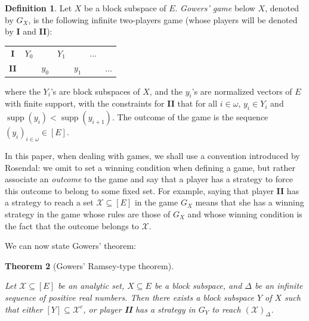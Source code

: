 \documentclass[a4paper,11pt]{article}
\newtheorem{thm}{Theorem}[section]
\theoremstyle{definition}
\newtheorem{defin}[thm]{Definition}
\numberwithin{equation}{section}
\newcommand{\X}{\mathcal{X}}
\newcommand{\I}{\textbf{I}}
\newcommand{\II}{\textbf{II}}
\DeclareMathOperator{\supp}{supp}
\begin{document}
\begin{defin}

Let $X$ be a block subspace of $E$. \emph{Gowers' game} below $X$, denoted by $G_X$, is the following infinite two-players game (whose players will be denoted by \I{} and \II{}):

\smallskip

\begin{tabular}{ccccccc}
\textbf{I} & $Y_0$ & & $Y_1$ & & $\hdots$ & \\
\textbf{II} & & $y_0$ & & $y_1$ & & $\hdots$ 
\end{tabular}

\smallskip

\noindent where the $Y_i$'s are block subspaces of $X$, and the $y_i$'s are normalized vectors of $E$ with finite support, with the constraints for \II{} that for all $i \in \omega$, $y_i \in Y_i$ and $\supp(y_i) < \supp(y_{i + 1})$. The outcome of the game is the sequence $(y_i)_{i \in \omega} \in [E]$.

\end{defin}

In this paper, when dealing with games, we shall use a convention introduced by Rosendal: we omit to set a winning condition when defining a game, but rather associate an \emph{outcome} to the game and say that a player has a strategy to force this outcome to belong to some fixed set. For example, saying that player \II{} has a strategy to reach a set $\X \subseteq [E]$ in the game $G_X$ means that she has a winning strategy in the game whose rules are those of $G_X$ and whose winning condition is the fact that the outcome belongs to $\X$.

\smallskip

We can now state Gowers' theorem:

\begin{thm}[Gowers' Ramsey-type theorem]\label{GowersThm}

Let $\X \subseteq [E]$ be an analytic set, $X \subseteq E$ be a block subspace, and $\Delta$ be an infinite sequence of positive real numbers. Then there exists a block subspace $Y$ of $X$ such that either $[Y] \subseteq \X^c$, or player \II{} has a strategy in $G_Y$ to reach $(\X)_\Delta$.

\end{thm}
\end{document}
